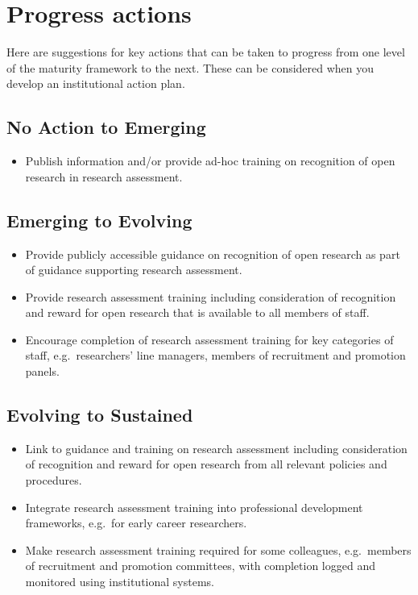 \documentclass[
  letterpaper,
  DIV=11,
  numbers=noendperiod,
  oneside]{scrreprt}
\providecommand{\tightlist}{%
  \setlength{\itemsep}{0pt}\setlength{\parskip}{0pt}}\usepackage{longtable,booktabs,array}
\begin{document}
\section{Progress actions}\label{progress-actions-6}

Here are suggestions for key actions that can be taken to progress from
one level of the maturity framework to the next. These can be considered
when you develop an institutional action plan.

\subsection{No Action to Emerging}\label{no-action-to-emerging-6}

\begin{itemize}
\tightlist
\item
  Publish information and/or provide ad-hoc training on recognition of
  open research in research assessment.
\end{itemize}

\subsection{Emerging to Evolving}\label{emerging-to-evolving-6}

\begin{itemize}
\item
  Provide publicly accessible guidance on recognition of open research
  as part of guidance supporting research assessment.
\item
  Provide research assessment training including consideration of
  recognition and reward for open research that is available to all
  members of staff.
\item
  Encourage completion of research assessment training for key
  categories of staff, e.g.~researchers' line managers, members of
  recruitment and promotion panels.
\end{itemize}

\subsection{Evolving to Sustained}\label{evolving-to-sustained-6}

\begin{itemize}
\item
  Link to guidance and training on research assessment including
  consideration of recognition and reward for open research from all
  relevant policies and procedures.
\item
  Integrate research assessment training into professional development
  frameworks, e.g.~for early career researchers.
\item
  Make research assessment training required for some colleagues,
  e.g.~members of recruitment and promotion committees, with completion
  logged and monitored using institutional systems.
\end{itemize}
\end{document}
